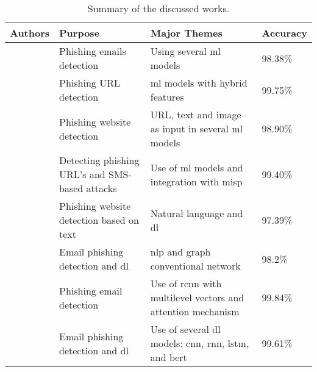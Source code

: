 \begin{table}[ht]
    \centering
    \caption{Summary of the discussed works.}
    \label{tbl:c2:comparison_table}
    \begin{tabular}{p{4cm}p{4cm}p{4cm}p{2cm}}
    \hline
    \textbf{Authors} & \textbf{Purpose} & \textbf{Major Themes} & \textbf{Accuracy} \\
    \hline
    \citet{rabbi2023phishy} & Phishing emails detection & Using several \ac{ml} models & 98.38\% \\
    \hline
    \citet{Kumar2023222} & Phishing URL detection & \ac{ml} models with hybrid features & 99.75\% \\
    \hline
    \citet{Shaukat2023} & Phishing website detection & URL, text and image as input in several \ac{ml} models & 98.90\% \\
    \hline
    \citet{Karhani2023206} & Detecting phishing URL's and SMS-based attacks & Use of \ac{ml} models and integration with \ac{misp} & 99.40\% \\
    \hline
    \citet{Benavides-Astudillo2023} & Phishing website detection based on text & Natural language and \ac{dl} & 97.39\% \\
    \hline
    \citet{ALHOGAIL2021102414} & Email phishing detection and \ac{dl} & \ac{nlp} and graph conventional network & 98.2\% \\
    \hline
    \citet{8701426} & Phishing email detection & Use of \ac{rcnn} with multilevel vectors and attention mechanism & 99.84\% \\
    \hline
    \citet{atawneh2023phishing} & Email phishing detection and \ac{dl} & Use of several \ac{dl} models: \ac{cnn}, \ac{rnn}, \ac{lstm}, and \ac{bert} & 99.61\% \\
    \hline
    \end{tabular}
    \end{table}